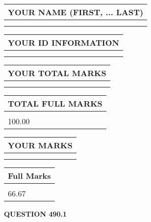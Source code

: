 \documentclass{ctexart}
\begin{document}
   
   
   
\newpage 
\setcounter{page}{ 
   490001 } 
   
   
   
   
\noindent\begin{tabular}{|l|}
\hline
YOUR NAME (FIRST, ... LAST)  \\
\hline
 \\ 
 \\ 
\hline
\end{tabular}
\hspace{0.05in} \begin{tabular}{|l|}
\hline
 YOUR   ID   INFORMATION  \\
\hline
 \\ 
 \\ 
\hline
\end{tabular}
   
   
\vspace{0.2in}\noindent\begin{tabular}{|l|}
\hline
YOUR TOTAL MARKS  \\
\hline
 \\ 
 \\ 
\hline
\end{tabular}
\hspace{0.05in} \begin{tabular}{|l|}
\hline
TOTAL FULL MARKS  \\
\hline
 \\ 
100.00 \\
\hline
\end{tabular}
   
   
 \vspace{0.2in}
 
 
 
 
   
   
  
\vspace{0.2in}
  
\noindent\begin{tabular}{|l|}
\hline
 YOUR MARKS  \\
\hline
 \\ 
 \\ 
\hline
\end{tabular}
\hspace{0.05in} \begin{tabular}{|l|}
\hline
 Full Marks  \\
\hline
 \\ 
66.67 \\
\hline
\end{tabular}
{\textbf{\Large{QUESTION
490.1 
}}}
  
\end{document}
